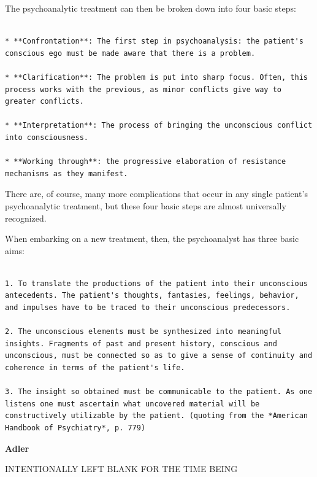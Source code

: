 The psychoanalytic treatment can then be broken down into four basic steps:

\begin{adjustwidth}{2.5em}{2.5em}
\begin{verbatim}

* **Confrontation**: The first step in psychoanalysis: the patient's conscious ego must be made aware that there is a problem. 

* **Clarification**: The problem is put into sharp focus. Often, this process works with the previous, as minor conflicts give way to greater conflicts.

* **Interpretation**: The process of bringing the unconscious conflict into consciousness.

* **Working through**: the progressive elaboration of resistance mechanisms as they manifest.

\end{verbatim}
\end{adjustwidth}

There are, of course, many more complications that occur in any single patient's psychoanalytic treatment, but these four basic steps are almost universally recognized.

When embarking on a new treatment, then, the psychoanalyst has three basic aims:

\begin{adjustwidth}{2.5em}{2.5em}
\begin{verbatim}

1. To translate the productions of the patient into their unconscious antecedents. The patient's thoughts, fantasies, feelings, behavior, and impulses have to be traced to their unconscious predecessors.

2. The unconscious elements must be synthesized into meaningful insights. Fragments of past and present history, conscious and unconscious, must be connected so as to give a sense of continuity and coherence in terms of the patient's life.

3. The insight so obtained must be communicable to the patient. As one listens one must ascertain what uncovered material will be constructively utilizable by the patient. (quoting from the *American Handbook of Psychiatry*, p. 779)

\end{verbatim}
\end{adjustwidth}

\textbf{Adler}

INTENTIONALLY LEFT BLANK FOR THE TIME BEING

